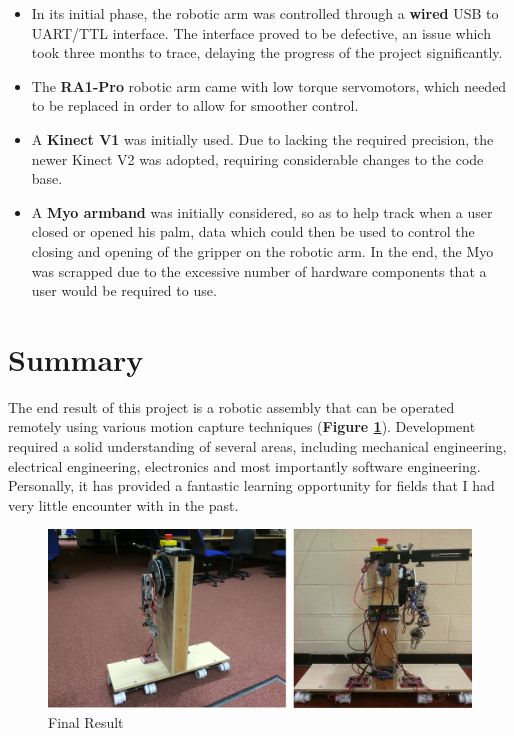 \documentclass[12p,a4paper]{report}
\begin{document}
\begin{itemize}
\item In its initial phase, the robotic arm was controlled through a  \textbf{wired} USB to UART/TTL interface. The interface proved to be defective, an issue which took three months to trace, delaying the progress of the project significantly.  

\item The \textbf{RA1-Pro} robotic arm came with low torque servomotors, which needed to be replaced in order to allow for smoother control.

\item A \textbf{Kinect V1} was initially used. Due to lacking the required precision, the newer Kinect V2 was adopted, requiring considerable changes to the code base.

\item A \textbf{Myo armband} was initially considered, so as to help track when a user closed or opened his palm, data which could then be used to control the closing and opening of the gripper on the robotic arm. In the end, the Myo was scrapped due to the excessive number of hardware components that a user would be required to use.
\end{itemize} 

\newpage
\section{Summary}
The end result of this project is a robotic assembly that can be operated remotely using various motion capture techniques (\textbf{Figure \ref{fig:finallook}}). Development required a solid understanding of several areas, including mechanical engineering, electrical engineering, electronics and most importantly software engineering. Personally, it has provided a fantastic learning opportunity for fields that I had very little encounter with in the past.


\begin{figure}[H]
\begin{center}
\includegraphics[scale=0.30]{finallook3_low}
\caption{Final Result}
\label{fig:finallook}
\end{center}
\end{figure}
\end{document}
